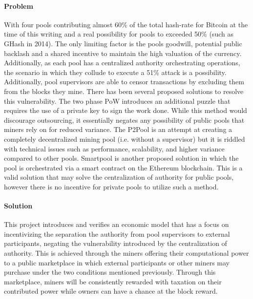 \paragraph{Problem} With four pools contributing almost 60\% of the total hash-rate for Bitcoin \cite{bitcoinpools2020} at the time of this writing and a real possibility for pools to exceeded 50\% (such as GHash in 2014). The only limiting factor is the pools goodwill, potential public backlash and a shared incentive to maintain the high valuation of the currency. Additionally, as each pool has a centralized authority orchestrating operations, the scenario in which they collude to execute a 51\% attack is a possibility. Additionally, pool supervisors are able to censor transactions by excluding them from the blocks they mine. There has been several proposed solutions to resolve this vulnerability. The two phase PoW \cite{bastiaan2015} introduces an additional puzzle that requires the use of a private key to sign the work done. While this method would discourage outsourcing, it essentially negates any possibility of public pools that miners rely on for reduced variance. The P2Pool is an attempt at creating a completely decentralized mining pool (i.e. without a supervisor) but it is riddled with technical issues such as performance, scalability, and higher variance compared to other pools. Smartpool \cite{smartpool2017} is another proposed solution in which the pool is orchestrated via a smart contract on the Ethereum blockchain. This is a valid solution that may solve the centralization of authority for public pools, however there is no incentive for private pools to utilize such a method. 

\paragraph{Solution} This project introduces and verifies an economic model  that has a focus on incentivizing the separation the authority from pool supervisors to external participants, negating the vulnerability introduced by the centralization of authority. This is achieved through the miners offering their computational power to a public marketplace in which external participants or other miners may purchase under the two conditions mentioned previously. Through this marketplace, miners will be consistently rewarded with taxation on their contributed power while owners can have a chance at the block reward.

